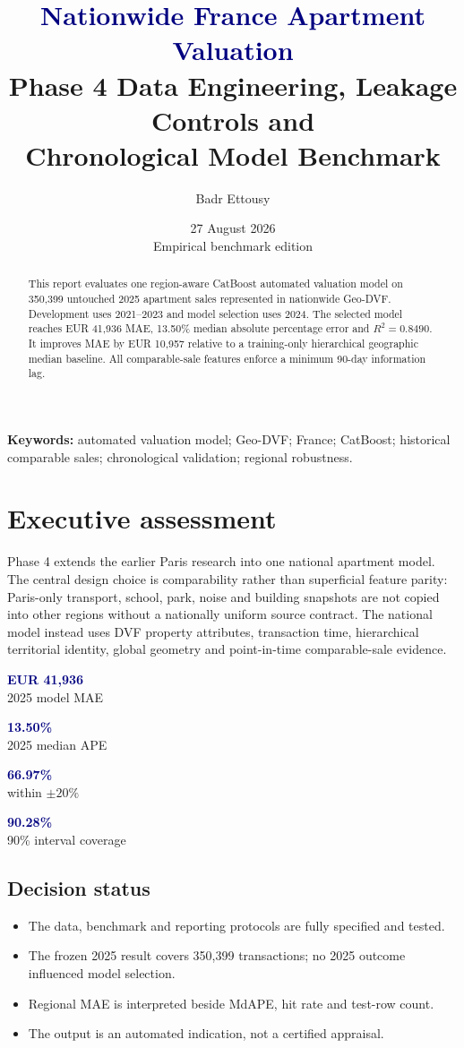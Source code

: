 \documentclass[11pt,a4paper]{article}
\title{\textcolor{navy}{\textbf{Nationwide France Apartment Valuation}}\\[0.25em]
\large Phase 4 Data Engineering, Leakage Controls and\\Chronological Model Benchmark}
\author{Badr Ettousy}
\date{27 August 2026\\\small Empirical benchmark edition}
\newcommand{\metriccard}[2]{\colorbox{light}{\begin{minipage}[c][1.45cm][c]{0.215\textwidth}\centering\textcolor{navy}{\Large\textbf{#1}}\\[-0.1em]\small\textcolor{muted}{#2}\end{minipage}}}
\begin{document}
\maketitle

\begin{abstract}
This report evaluates one region-aware CatBoost automated valuation model
on 350,399 untouched 2025 apartment sales represented in nationwide Geo-DVF.
Development uses 2021--2023 and model selection uses 2024. The selected model reaches EUR
41,936 MAE, 13.50\% median absolute
percentage error and $R^2=0.8490$. It improves MAE by EUR
10,957 relative to a training-only hierarchical
geographic median baseline. All comparable-sale features enforce a minimum 90-day information lag.
\end{abstract}

\textbf{Keywords:} automated valuation model; Geo-DVF; France; CatBoost;
historical comparable sales; chronological validation; regional robustness.

\tableofcontents
\clearpage

\section{Executive assessment}

Phase 4 extends the earlier Paris research into one national apartment model. The
central design choice is comparability rather than superficial feature parity:
Paris-only transport, school, park, noise and building snapshots are not copied
into other regions without a nationally uniform source contract. The national
model instead uses DVF property attributes, transaction time, hierarchical
territorial identity, global geometry and point-in-time comparable-sale evidence.


\begin{center}
\metriccard{EUR 41,936}{2025 model MAE} \hfill
\metriccard{13.50\%}{2025 median APE} \hfill
\metriccard{66.97\%}{within $\pm 20\%$} \hfill
\metriccard{90.28\%}{90\% interval coverage}
\end{center}


\subsection*{Decision status}
\begin{itemize}[leftmargin=1.5em]
\item The data, benchmark and reporting protocols are fully specified and tested.
\item The frozen 2025 result covers 350,399 transactions; no 2025 outcome influenced model selection.
\item Regional MAE is interpreted beside MdAPE, hit rate and test-row count.
\item The output is an automated indication, not a certified appraisal.
\end{itemize}
\end{document}
